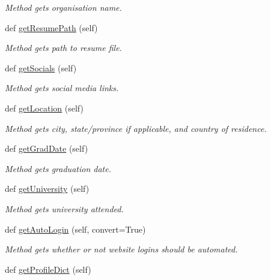 \begin{DoxyCompactItemize}
\begin{DoxyCompactList}\small\item\em Method gets organisation name. \end{DoxyCompactList}\item 
def \hyperlink{classuserProfile_1_1userProfile_aa89ac2871990f63c02a2bebb3393c979}{get\+Resume\+Path} (self)
\begin{DoxyCompactList}\small\item\em Method gets path to resume file. \end{DoxyCompactList}\item 
def \hyperlink{classuserProfile_1_1userProfile_ab2a8462b4239f832cdc0bc774ca60968}{get\+Socials} (self)
\begin{DoxyCompactList}\small\item\em Method gets social media links. \end{DoxyCompactList}\item 
def \hyperlink{classuserProfile_1_1userProfile_a50577f0100db886c2c5d6cdfc61c73a6}{get\+Location} (self)
\begin{DoxyCompactList}\small\item\em Method gets city, state/province if applicable, and country of residence. \end{DoxyCompactList}\item 
def \hyperlink{classuserProfile_1_1userProfile_acdaf40b01b5086ab70b8802ba944b337}{get\+Grad\+Date} (self)
\begin{DoxyCompactList}\small\item\em Method gets graduation date. \end{DoxyCompactList}\item 
def \hyperlink{classuserProfile_1_1userProfile_a25a425c5045c07739c784f7f8dcff2af}{get\+University} (self)
\begin{DoxyCompactList}\small\item\em Method gets university attended. \end{DoxyCompactList}\item 
def \hyperlink{classuserProfile_1_1userProfile_aa3806d54ee2f967e826537926e5aadf8}{get\+Auto\+Login} (self, convert=True)
\begin{DoxyCompactList}\small\item\em Method gets whether or not website logins should be automated. \end{DoxyCompactList}\item 
def \hyperlink{classuserProfile_1_1userProfile_adb914cd59899ee5fc36c23be7f2219d0}{get\+Profile\+Dict} (self)

\end{DoxyCompactItemize}
